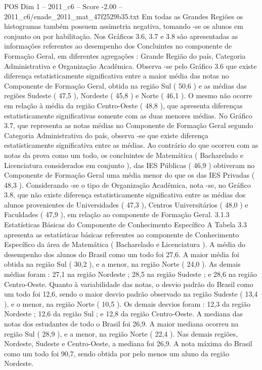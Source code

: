 \begin{textsample}{POS Dim 1 – 2011\_c6 – Score -2.00 – 2011\_c6/enade\_2011\_mat\_47f2529b35.txt}
Em todas as Grandes Regiões os histogramas também possuem assimetria negativa, tomando -se os alunos em conjunto ou por habilitação.
Nos Gráficos 3.6, 3.7 e 3.8 são apresentadas as informações referentes ao desempenho dos Concluintes no componente de Formação Geral, em diferentes agregações : Grande Região do país, Categoria Administrativa e Organização Acadêmica.
Observa -se pelo Gráfico 3.6 que existe diferença estatisticamente significativa entre a maior média das notas no Componente de Formação Geral, obtida na região Sul ( 50,6 ) e as médias das regiões Sudeste ( 47,5 ), Nordeste ( 45,8 ) e Norte ( 46,1 ).
O mesmo não ocorre em relação à média da região Centro-Oeste ( 48,8 ), que apresenta diferenças estatisticamente significativas somente com as duas menores médias.
No Gráfico 3.7, que representa as notas médias no Componente de Formação Geral segundo Categoria Administrativa do país, observa -se que existe diferença estatisticamente significativa entre as médias.
Ao contrário do que ocorreu com as notas da prova como um todo, os concluintes de Matemática ( Bacharelado e Licenciatura considerados em conjunto ), das IES Públicas ( 46,9 ) obtiveram no Componente de Formação Geral uma média menor do que os das IES Privadas ( 48,3 ).
Considerando -se o tipo de Organização Acadêmica, nota -se, no Gráfico 3.8, que não existe diferença estatisticamente significativa entre as médias dos alunos provenientes de Universidades ( 47,3 ), Centros Universitários ( 48,0 ) e Faculdades ( 47,9 ), em relação ao componente de Formação Geral. 3.1.3 Estatísticas Básicas do Componente de Conhecimento Específico A Tabela 3.3 apresenta as estatísticas básicas referentes ao componente de Conhecimento Específico da área de Matemática ( Bacharelado e Licenciatura ).
A média do desempenho dos alunos do Brasil como um todo foi 27,6.
A maior média foi obtida na região Sul ( 30,2 ), e a menor, na região Norte ( 24,0 ).
As demais médias foram : 27,1 na região Nordeste ; 28,5 na região Sudeste ; e 28,6 na região Centro-Oeste.
Quanto à variabilidade das notas, o desvio padrão do Brasil como um todo foi 12,6, sendo o maior desvio padrão observado na região Sudeste ( 13,4 ), e o menor, na região Norte ( 10,5 ).
Os demais desvios foram : 12,3 da região Nordeste ; 12,6 da região Sul ; e 12,8 da região Centro-Oeste.
A mediana das notas dos estudantes de todo o Brasil foi 26,9.
A maior mediana ocorreu na região Sul ( 28,9 ), e a menor, na região Norte ( 22,4 ).
Nas demais regiões, Nordeste, Sudeste e Centro-Oeste, a mediana foi 26,9.
A nota máxima do Brasil como um todo foi 90,7, sendo obtida por pelo menos um aluno da região Nordeste.

\end{textsample}
